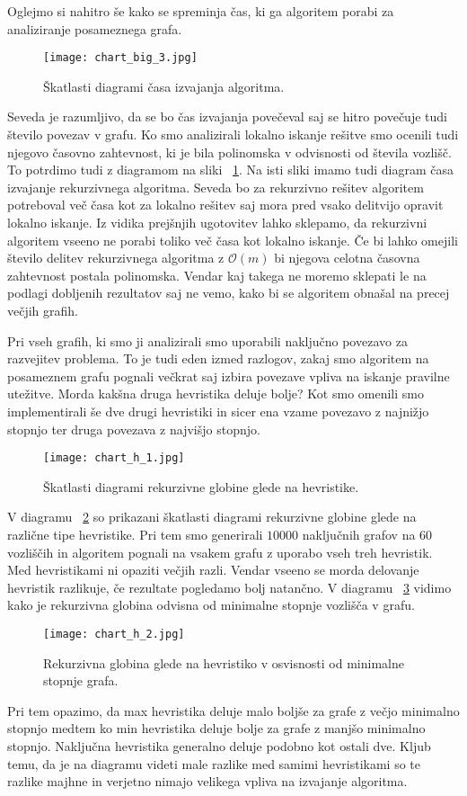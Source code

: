 \documentclass[12pt,a4paper,twoside]{article}
\theoremstyle{definition} %
\theoremstyle{plain} %
\numberwithin{equation}{section}  %
\begin{document}
Oglejmo si nahitro še kako se spreminja čas, ki ga algoritem porabi za analiziranje posameznega grafa.
 \begin{figure}[h!]
\caption{Škatlasti diagrami časa izvajanja algoritma.}
\label{chart_big_3}
\centering
    \texttt{[image: chart\_big\_3.jpg]}
    \end{figure}
Seveda je razumljivo, da se bo čas izvajanja povečeval saj se hitro povečuje tudi število povezav v grafu. Ko smo analizirali lokalno iskanje rešitve smo ocenili tudi njegovo časovno zahtevnost, ki je bila polinomska v odvisnosti od števila vozlišč. To potrdimo tudi z diagramom na sliki ~\ref{chart_big_3}. Na isti sliki imamo tudi diagram časa izvajanje rekurzivnega algoritma. Seveda bo za rekurzivno rešitev algoritem potreboval več časa kot za lokalno rešitev saj mora pred vsako delitvijo opravit lokalno iskanje. Iz vidika prejšnjih ugotovitev lahko sklepamo, da rekurzivni algoritem vseeno ne porabi toliko več časa kot lokalno iskanje. Če bi lahko omejili število delitev rekurzivnega algoritma z $\mathcal{O}(m)$ bi njegova celotna časovna zahtevnost postala polinomska. Vendar kaj takega ne moremo sklepati le na podlagi dobljenih rezultatov saj ne vemo, kako bi se algoritem obnašal na precej večjih grafih.

Pri vseh grafih, ki smo ji analizirali smo uporabili naključno povezavo za razvejitev problema. To je tudi eden izmed razlogov, zakaj smo algoritem na posameznem grafu pognali večkrat saj izbira povezave vpliva na iskanje pravilne utežitve. Morda kakšna druga hevristika deluje bolje? Kot smo omenili smo implementirali še dve drugi hevristiki in sicer ena vzame povezavo z najnižjo stopnjo ter druga povezava z najvišjo stopnjo. 
 \begin{figure}[h!]
\caption{Škatlasti diagrami rekurzivne globine glede na hevristike.}
\label{chart_h_1}
\centering
    \texttt{[image: chart\_h\_1.jpg]}
    \end{figure}
V diagramu ~\ref{chart_h_1} so prikazani škatlasti diagrami rekurzivne globine glede na različne tipe hevristike. Pri tem smo generirali $10000$ naključnih grafov na $60$ vozliščih in algoritem pognali na vsakem grafu z uporabo vseh treh hevristik. Med hevristikami ni opaziti večjih razli. Vendar vseeno se morda delovanje hevristik razlikuje, če rezultate pogledamo bolj natančno. V diagramu  ~\ref{chart_h_2} vidimo kako je rekurzivna globina odvisna od minimalne stopnje vozlišča v grafu.
 \begin{figure}[h!]
\caption{Rekurzivna globina glede na hevristiko v osvisnosti od minimalne stopnje grafa.}
\label{chart_h_2}
\centering
    \texttt{[image: chart\_h\_2.jpg]}
    \end{figure}
Pri tem opazimo, da max hevristika deluje malo boljše za grafe z večjo minimalno stopnjo medtem ko min hevristika deluje bolje za grafe z manjšo  minimalno stopnjo. Naključna hevristika generalno deluje podobno kot ostali dve. Kljub temu, da je na diagramu videti male razlike med samimi hevristikami so te razlike majhne in verjetno nimajo velikega vpliva na izvajanje algoritma.
\end{document}
